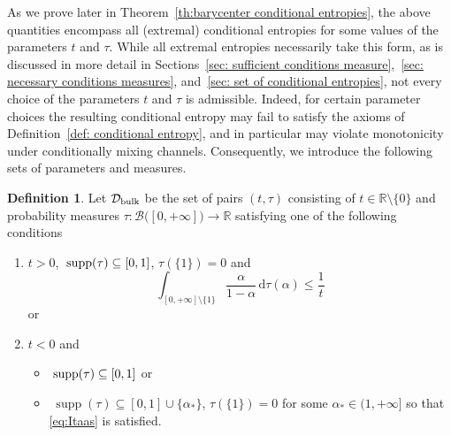 \documentclass[aps,pra,11pt,onecolumn,nofootinbib,tightenlines]{revtex4-2}
\theoremstyle{definition}
\newtheorem{definition}[theorem]{Definition}
\newcommand{\D}{\mathcal{D}}
\newcommand{\R}{\mathbb{R}}
\newcommand{\mc}[1]{\mathcal{#1}}
\newcommand{\mb}[1]{\mathbb{#1}}
\begin{document}
As we prove later in Theorem~\ref{th:barycenter conditional entropies}, the above quantities encompass all (extremal) conditional entropies for some values of the parameters $t$ and $\tau$. While all extremal entropies necessarily take this form, as is discussed in more detail in Sections~\ref{sec: sufficient conditions measure},~\ref{sec: necessary conditions measures}, and~\ref{sec: set of conditional entropies}, not every choice of the parameters \(t\) and \(\tau\) is admissible. Indeed, for certain parameter choices the resulting conditional entropy may fail to satisfy the axioms of Definition~\ref{def: conditional entropy}, and in particular may violate monotonicity under conditionally mixing channels.
Consequently, we introduce the following sets of parameters and measures.



\begin{definition}
\label{def: D}
Let \(\D_{\rm{bulk}}\) be the set of pairs $(t,\tau)$ consisting of $t\in\R\setminus\{0\}$ and probability measures $\tau:\mc B\big([0,+\infty]\big)\to\mb R$ satisfying one of the following conditions
\begin{enumerate}[itemsep=0pt,topsep=5pt]
    \item $t > 0$, $\;\textup{supp}(\tau) \subseteq [0,1]$, $\tau(\{1\})=0$ and
    \begin{equation}\label{eq:Itaas}
    \int_{[0,+\infty]\setminus\{1\}}\frac{\alpha}{1-\alpha}\,\mathrm{d}\tau(\alpha)\leq\frac{1}{t}
    \end{equation}
    or
    \item $t < 0$ and
    \begin{itemize}
    \item[(a)] $\;\textup{supp}(\tau) \subseteq [0,1]$ or
    \item[(b)] $\;\operatorname{supp}(\tau) \subseteq [0,1] \cup \{\alpha_*\}$, $\tau(\{1\})=0$ for some $\alpha_* \in (1, +\infty]$ so that \eqref{eq:Itaas} is satisfied.
    \end{itemize}
\end{enumerate}
\end{definition}
\end{document}
